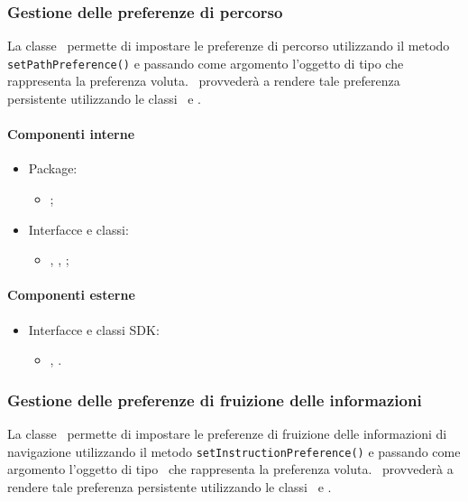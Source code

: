 \documentclass[../Funzionalita.tex]{subfiles}
\begin{document}
		
		\subsubsection{Gestione delle preferenze di percorso}
			La classe \SettingImp\ permette di impostare le preferenze di percorso utilizzando il metodo \lstinline|setPathPreference()| e passando come argomento l'oggetto di tipo \PathPreference che rappresenta la preferenza voluta. \SettingImp\ provvederà a rendere tale preferenza persistente utilizzando le classi \SharedPreferences\ e \SharedPreferenceEditor.

			\paragraph*{Componenti interne}
			\begin{itemize}
			
				\item Package:
				\begin{itemize}
					\item[] \usersetting;
				\end{itemize}
				
				\item Interfacce e classi:
				\begin{itemize}
					\item[] \Setting, \SettingImp, \PathPreference;
				\end{itemize}
				
			\end{itemize}
			
			
			\paragraph*{Componenti esterne}
			
			\begin{itemize}
				\item Interfacce e classi SDK:
				\begin{itemize}
					\item[] \SharedPreferences, \SharedPreferenceEditor.
				\end{itemize}
			\end{itemize}
		
		
		\subsubsection{Gestione delle preferenze di fruizione delle informazioni}
			La classe \SettingImp\ permette di impostare le preferenze di fruizione delle informazioni di navigazione utilizzando il metodo \lstinline|setInstructionPreference()| e passando come argomento l'oggetto di tipo \InstructionPreference\ che rappresenta la preferenza voluta. \SettingImp\ provvederà a rendere tale preferenza persistente utilizzando le classi \SharedPreferences\ e \SharedPreferenceEditor.
		
\end{document}
